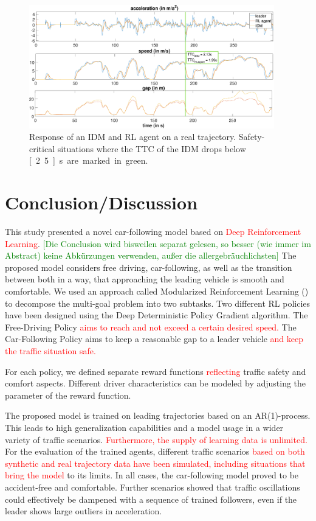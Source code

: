 \documentclass[review]{elsarticle}
\providecommand{\red}[1]{\textcolor{red}{#1}}
\providecommand{\green}[1]{\textcolor{green}{#1}}
\providecommand{\martin}[1]{\red{#1}} %
\providecommand{\martinc}[1]{\green{[#1]}} %
\providecommand{\3}{{\ss}}
\begin{document}
\begin{figure}	
	\centering
	\includegraphics[width=0.95\textwidth]{images/TTC_CaseStudy}
	\caption{Response of an IDM and RL agent on a real trajectory. Safety-critical situations where the TTC of the IDM drops below \unit[2.5]{s} are marked in green.}
	\label{fig:TTC_CaseStudy}
\end{figure}

\section{Conclusion/Discussion}
\label{sec:conclusion}
This study presented a novel car-following model based on
\martin{Deep Reinforcement Learning}. \martinc{Die Conclusion wird
  bisweilen separat gelesen, so besser (wie immer im Abstract) keine
  Abk\"urzungen verwenden, au\3er die allergebr\"auchlichsten} The
proposed model considers free driving, car-following, as well as the
transition between both in a way, that approaching the leading vehicle
is smooth and comfortable. We used an approach called Modularized
Reinforcement Learning (\cite{MRL}) to decompose the multi-goal
problem into two subtasks. Two different RL policies have been
designed using the Deep Deterministic Policy Gradient algorithm. The
Free-Driving Policy \martin{aims to reach and not exceed a certain
desired speed.} The Car-Following Policy aims to keep a reasonable gap
to a leader vehicle \martin{and keep the traffic situation safe.} 

For each policy, we defined separate reward functions \martin{reflecting} traffic safety and comfort aspects. 
Different driver characteristics can be modeled by adjusting the parameter of the reward function.

The proposed model is trained on leading trajectories based on an
AR(1)-process. This leads to high generalization capabilities and a
model usage in a wider variety of traffic scenarios. \martin{Furthermore, the
supply of learning data is unlimited.}
For the evaluation of the trained agents, different traffic scenarios
\martin{based on both synthetic and
real trajectory data have been simulated, including situations that
bring the model} to its limits. 
In all cases, the car-following model proved to be accident-free and
comfortable. Further scenarios showed that traffic oscillations could
effectively be dampened with a sequence of trained followers, even if
the leader shows large outliers in acceleration.
\end{document}
